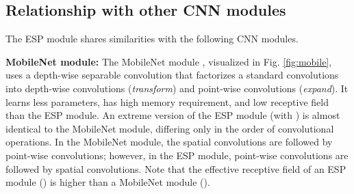 \documentclass[runningheads]{llncs}
\def\Fig{Fig. }
\begin{document}
\subsection{Relationship with other CNN modules}
\label{ssec:relationship}
The ESP module shares similarities with the following CNN modules.

\noindent \textbf{MobileNet module:} The MobileNet module \cite{howard2017mobilenets}, visualized in  \Fig \ref{fig:mobile}, uses a depth-wise separable convolution \cite{chollet2016xception} that factorizes a standard convolutions into depth-wise convolutions (\textit{transform}) and point-wise convolutions (\textit{expand}). It learns less parameters, has high memory requirement, and low receptive field than the ESP module. 
An extreme version of the ESP module (with ) is almost identical to the MobileNet module, differing only in the order of convolutional operations. In the MobileNet module, the spatial convolutions are followed by point-wise convolutions; however, in the ESP module, point-wise convolutions are followed by spatial convolutions. Note that the effective receptive field of an ESP module () is higher than a MobileNet module ().
\end{document}
